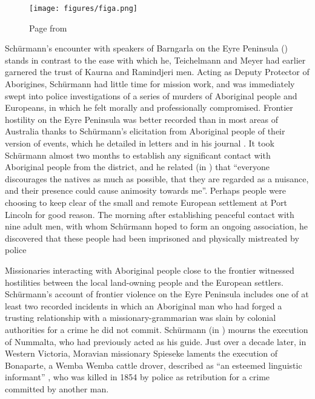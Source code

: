 \begin{figure}
\texttt{[image: figures/figa.png]}
\caption{Page from \citet[270]{gunther_native_1838}}
\end{figure} 

Schürmann’s encounter with speakers of Barngarla on the Eyre Peninsula () stands in contrast to the ease with which he, Teichelmann and Meyer had earlier garnered the trust of Kaurna and Ramindjeri men. Acting as Deputy Protector of Aborigines, Schürmann had little time for mission work, and was immediately swept into police investigations of a series of murders of Aboriginal people and Europeans, in which he felt morally and professionally compromised. Frontier hostility on the Eyre Peninsula was better recorded than in most areas of Australia thanks to Schürmann’s elicitation from Aboriginal people of their version of events, which he detailed in letters and in his journal \citep{schurmann_diaries_1838}. It took Schürmann almost two months to establish any significant contact with Aboriginal people from the district, and he related (in \citealt[113]{schurmann_id_1987}) that “everyone discourages the natives as much as possible, that they are regarded as a nuisance, and their presence could cause animosity towards me”. Perhaps people were choosing to keep clear of the small and remote European settlement at Port Lincoln for good reason. The morning after establishing peaceful contact with nine adult men, with whom Schürmann hoped to form an ongoing association, he discovered that these people had been imprisoned and physically mistreated by police \citep[113]{schurmann_id_1987}

Missionaries interacting with Aboriginal people close to the frontier witnessed hostilities between the local land-owning people and the European settlers. Schürmann’s account of frontier violence on the Eyre Peninsula includes one of at least two recorded incidents in which an Aboriginal man who had forged a trusting relationship with a missionary-grammarian was slain by colonial authorities for a crime he did not commit. Schürmann (in \citealt[151--152]{schurmann_id_1987}) mourns the execution of Nummalta, who had previously acted as his guide. Just over a decade later, in Western Victoria, Moravian missionary Spieseke laments the execution of Bonaparte, a Wemba Wemba cattle drover, described as “an esteemed linguistic informant” \citep[85]{jensz_german_2010}, who was killed in 1854 by police as retribution for a crime committed by another man. 

